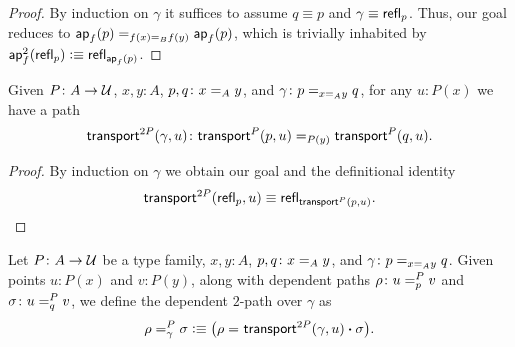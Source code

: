 \begin{proof}
    By induction on $\gamma$ it suffices to assume $q\equiv p$ and $\gamma\equiv\mathsf{refl}_p$. Thus, our goal reduces to $\mathsf{ap}_f(p)\mathrel{=_{f(x)\mathrel{=_{B}}f(y)}}\mathsf{ap}_f(p)$, which is trivially inhabited by $\mathsf{ap}^2_f(\mathsf{refl}_p)\mathrel{\vcentcolon}\equiv\mathsf{refl}_{\mathsf{ap}_f(p)}$.
\end{proof}

\begin{lem}
    Given\/ $P\colon A\to\univ$,\/ $x,y\colon A$,\/ $p,q\colon x\eq{A}y$, and\/ $\gamma\colon p\eq{x\eq{A}y}q$, for any\/ $u\colon P(x)$ we have a path
    \[
        \fun{transport}^{2P}(\gamma,u)\colon
        \fun{transport}^P(p,u)
        \eq{P(y)}
        \fun{transport}^P(q,u).
    \]
\end{lem}

\begin{proof}
    By induction on $\gamma$ we obtain our goal and the definitional identity
    \[
        \mathsf{transport}^{2P}(\mathsf{refl}_p,u)
        \equiv
        \mathsf{refl}_{\mathsf{transport}^P(p,u)}.\qedhere
    \]
\end{proof}

\begin{defn}
    Let $P\colon A\to\univ$ be a type family, $x,y\colon A$, $p,q\colon x\eq Ay$, and $\gamma\colon p\eq{x\eq Ay}q$. Given points $u\colon P(x)$ and $v\colon P(y)$, along with dependent paths $\rho\colon u\eqt pPv$ and $\sigma\colon u\eqt qPv$, we define the dependent $2$-path over $\gamma$ as
    \[
        \rho=_{\gamma}^{P}\sigma
            \mathrel{\vcentcolon}\equiv\bigl(
                \rho\mathrel{=_{}}\mathsf{transport}^{2P}(\gamma,u)
                \mathbin{\boldsymbol{\cdot}}
                \sigma
            \bigr).
    \]
\end{defn}

